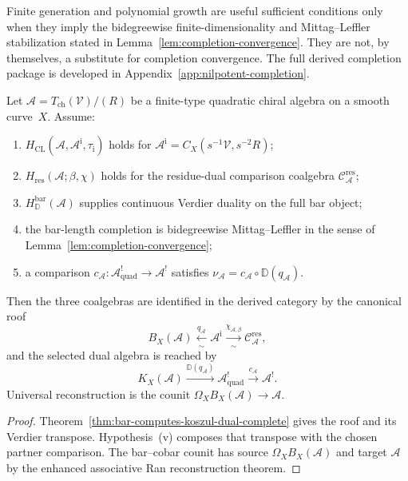 \begin{remark}
Finite generation and polynomial growth are useful sufficient
conditions only when they imply the bidegreewise finite-dimensionality
and Mittag--Leffler stabilization stated in
Lemma~\ref{lem:completion-convergence}. They are not, by themselves, a
substitute for completion convergence. The full derived completion
package is developed in Appendix~\ref{app:nilpotent-completion}.
\end{remark}

\begin{corollary}
\label{cor:circularity-free-koszul}
Let $\mathcal A=T_{\mathrm{ch}}(\mathcal V)/(R)$ be a finite-type
quadratic chiral algebra on a smooth curve~$X$.  Assume:
\begin{enumerate}[label=\textup{(\roman*)}]
\item\label{hyp:fg}
$H_{\mathrm{CL}}(\mathcal A,\mathcal A^{\mathrm i},
\tau_{\mathrm i})$ holds for
$\mathcal A^{\mathrm i}=C_X(s^{-1}\mathcal V,s^{-2}R)$;
\item\label{hyp:poly}
$H_{\mathrm{res}}(\mathcal A;\beta,\chi)$ holds for the
residue-dual comparison coalgebra
$\mathcal C_{\mathcal A}^{\mathrm{res}}$;
\item\label{hyp:pbw-koszul}
$H_{\mathbb D}^{\mathrm{bar}}(\mathcal A)$ supplies continuous
Verdier duality on the full bar object;
\item\label{hyp:smooth} the bar-length completion is
 bidegreewise Mittag--Leffler in the sense of
 Lemma~\ref{lem:completion-convergence};
\item a comparison
$c_{\mathcal A}\colon\mathcal A^!_{\mathrm{quad}}\to\mathcal A^!$
satisfies
$\nu_{\mathcal A}=c_{\mathcal A}\circ\mathbb D(q_{\mathcal A})$.
\end{enumerate}
Then the three coalgebras are identified in the derived category by
the canonical roof
\[
 B_X(\mathcal A)
 \xleftarrow[\sim]{q_{\mathcal A}}
 \mathcal A^{\mathrm i}
 \xrightarrow[\sim]{\chi_{\mathcal A,\beta}}
 \mathcal C_{\mathcal A}^{\mathrm{res}},
\]
and the selected dual algebra is reached by
\[
 K_X(\mathcal A)
 \xrightarrow{\mathbb D(q_{\mathcal A})}
 \mathcal A^!_{\mathrm{quad}}
 \xrightarrow{c_{\mathcal A}}\mathcal A^!.
\]
Universal reconstruction is the counit
$\Omega_XB_X(\mathcal A)\to\mathcal A$.
\end{corollary}

\begin{proof}
Theorem~\ref{thm:bar-computes-koszul-dual-complete} gives the roof and
its Verdier transpose.  Hypothesis~\textup{(v)} composes that
transpose with the chosen partner comparison.  The bar--cobar counit
has source $\Omega_XB_X(\mathcal A)$ and target $\mathcal A$ by the
enhanced associative Ran reconstruction theorem.
\end{proof}


